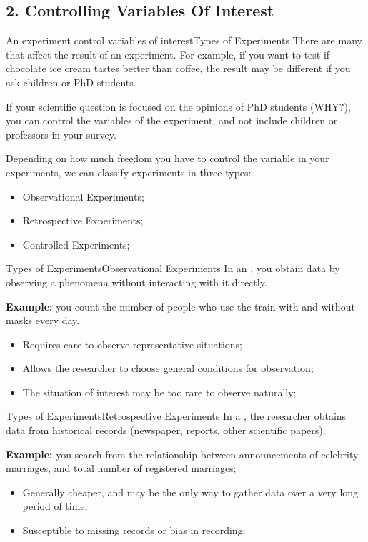 \subsection{2. Controlling Variables Of Interest}
\begin{frame}{An experiment control variables of interest}{Types of Experiments}
  There are many  that affect the result of an experiment. For example, if you want to test if chocolate ice cream tastes better than coffee, the result may be different if you ask children or PhD students.\bigskip

  If your scientific question is focused on the opinions of PhD students (WHY?), you can control the variables of the experiment, and not include children or professors in your survey.\bigskip

  Depending on how much freedom you have to control the variable in your experiments, we can classify experiments in three types:
  \begin{itemize}
    \item Observational Experiments;
    \item Retrospective Experiments;
    \item Controlled Experiments;
  \end{itemize}
\end{frame}

\begin{frame}{Types of Experiments}{Observational Experiments}
  In an , you obtain data by observing a phenomena without interacting with it directly.
  \bigskip

  {\bf Example:} you count the number of people who use the train with and without masks every day.
  \bigskip

  \begin{itemize}
    \item Requires care to observe representative situations;
    \item Allows the researcher to choose general conditions for observation;
    \item The situation of interest may be too rare to observe naturally;
  \end{itemize}
\end{frame}

\begin{frame}{Types of Experiments}{Retrospective Experiments}
  In a , the researcher obtains data from historical records (newspaper, reports, other scientific papers).\bigskip

  {\bf Example:} you search from the relationship between announcements of celebrity marriages, and total number of registered marriages;\bigskip

  \begin{itemize}
    \item Generally cheaper, and may be the only way to gather data over a very long period of time;
    \item Susceptible to missing records or bias in recording;
  \end{itemize}
\end{frame}

